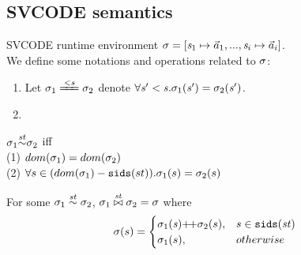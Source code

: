 \subsection{SVCODE semantics}

SVCODE runtime environment $\sgm = [\s_1 \|-> {\a_1},...,\s_i \|-> {\a_i}]$.\\
We define some notations and operations related to $\sigma$:
\begin{enumerate}[(1)]
\item Let $\sgm_1 \ConEq{\s} \sgm_2$ denote $\forall \mathit{s}' < \mathit{s}. \sigma_1(\mathit{s}') = \sigma_2(\mathit{s}')$. \\

\item {}
\PT{\Axiom{\sgm(\s) = \a}} 

\end{enumerate}

\begin{defi}
	\label{sgm-sim}
	
	$\sigma_1 {\stackrel{\mathit{st}}{\sim}} \sigma_2 $
	 iff \\
	\indent (1) $dom(\sigma_1) = dom(\sigma_2)$ \\
	\indent (2) $\forall s \in (dom(\sigma_1) - \mathtt{sids}(st)).\sigma_1(s)= \sigma_2(s)$ \\
\end{defi}

\begin{defi}
	\label{sgm-join}
	
	For some $\sigma_1 \stackrel{\mathit{st}}{\sim} \sigma_2$,
	$\sigma_1 \stackrel{\mathit{st}}{\bowtie} \sigma_2 = \sigma$ where 
	$$\sgm(s) =
		\begin{cases}
		\sgm_1(\s) {\++} \sgm_2(s), & s \in \sids{\st} \\
		\sgm_1(s),&  otherwise
		\end{cases} $$ 
\end{defi}

